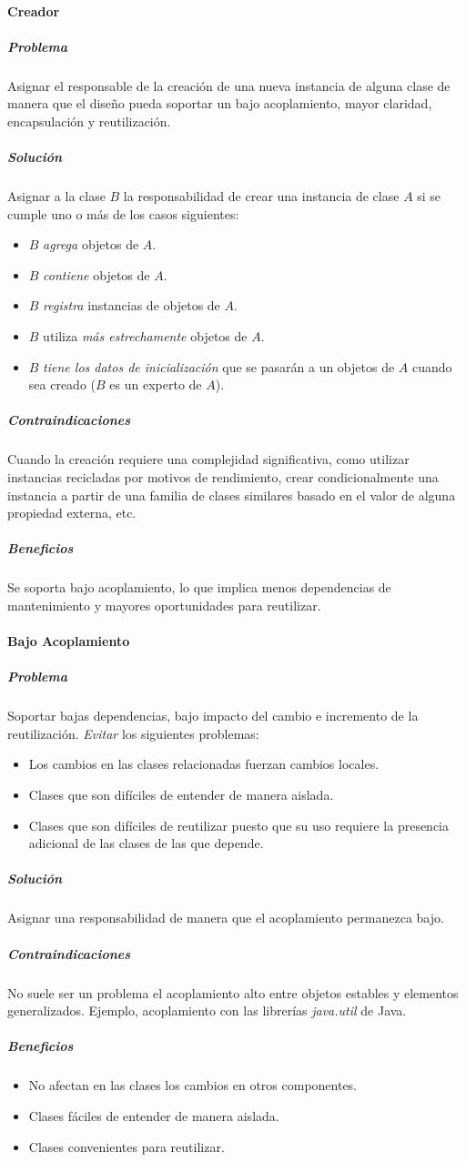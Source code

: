 \paragraph{Creador}
\subparagraph{Problema}
Asignar el responsable de la creación de una nueva instancia de alguna clase de manera que el diseño pueda soportar un bajo acoplamiento, mayor claridad, encapsulación y reutilización.
\subparagraph{Solución}
Asignar a la clase $B$ la responsabilidad de crear una instancia de clase $A$ si se cumple uno o más de los casos siguientes:
\begin{itemize}
\item $B$ \emph{agrega} objetos de $A$.
\item $B$ \emph{contiene} objetos de $A$.
\item $B$ \emph{registra} instancias de objetos de $A$.
\item $B$ utiliza \emph{más estrechamente} objetos de $A$.
\item $B$ \emph{tiene los datos de inicialización} que se pasarán a un objetos de $A$ cuando sea creado ($B$ es un experto de $A$).
\end{itemize}
\subparagraph{Contraindicaciones}
Cuando la creación requiere una complejidad significativa, como utilizar instancias recicladas por motivos de rendimiento, crear condicionalmente una instancia a partir de una familia de clases similares basado en el valor de alguna propiedad externa, etc.
\subparagraph{Beneficios}
Se soporta bajo acoplamiento, lo que implica menos dependencias de mantenimiento y mayores oportunidades para reutilizar.
\paragraph{Bajo Acoplamiento}
\subparagraph{Problema}
Soportar bajas dependencias, bajo impacto del cambio e incremento de la reutilización. \emph{Evitar} los siguientes problemas:
\begin{itemize}
\item Los cambios en las clases relacionadas fuerzan cambios locales.
\item Clases que son difíciles de entender de manera aislada.
\item Clases que son difíciles de reutilizar puesto que su uso requiere la presencia adicional de las clases de las que depende.
\end{itemize}
\subparagraph{Solución}
Asignar una responsabilidad de manera que el acoplamiento permanezca bajo.
\subparagraph{Contraindicaciones}
No suele ser un problema el acoplamiento alto entre objetos estables y elementos generalizados. Ejemplo, acoplamiento con las librerías \emph{java.util} de Java.
\subparagraph{Beneficios}
\begin{itemize}
\item No afectan en las clases los cambios en otros componentes.
\item Clases fáciles de entender de manera aislada.
\item Clases convenientes para reutilizar.
\end{itemize}
